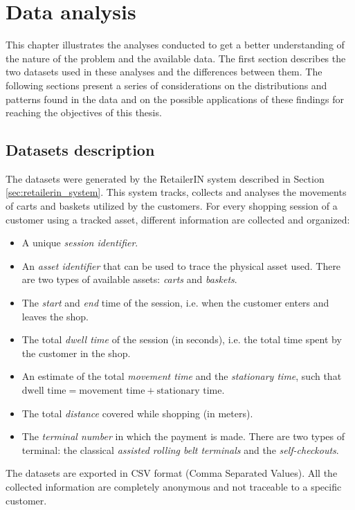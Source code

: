 \chapter{Data analysis}
\label{cha:data_analysis}

This chapter illustrates the analyses conducted to get a better understanding of the nature of the problem and the available data. The first section describes the two datasets used in these analyses and the differences between them. The following sections present a series of considerations on the distributions and patterns found in the data and on the possible applications of these findings for reaching the objectives of this thesis.

\section{Datasets description}
\label{sec:datasets_description}

The datasets were generated by the RetailerIN system described in Section \ref{sec:retailerin_system}. This system tracks, collects and analyses the movements of carts and baskets utilized by the customers. For every shopping session of a customer using a tracked asset, different information are collected and organized:
\begin{itemize}
  \item A unique \emph{session identifier}.
  \item An \emph{asset identifier} that can be used to trace the physical asset used. There are two types of available assets: \emph{carts} and \emph{baskets}.
  \item The \emph{start} and \emph{end} time of the session, i.e. when the customer enters and leaves the shop.
  \item The total \emph{dwell time} of the session (in seconds), i.e. the total time spent by the customer in the shop.
  \item An estimate of the total \emph{movement time} and the \emph{stationary time}, such that \( \text{dwell time} = \text{movement time} + \text{stationary time} \).
  \item The total \emph{distance} covered while shopping (in meters).
  \item The \emph{terminal number} in which the payment is made. There are two types of terminal: the classical \emph{assisted rolling belt terminals} and the \emph{self-checkouts}.
\end{itemize}
The datasets are exported in CSV format (Comma Separated Values). All the collected information are completely anonymous and not traceable to a specific customer.

